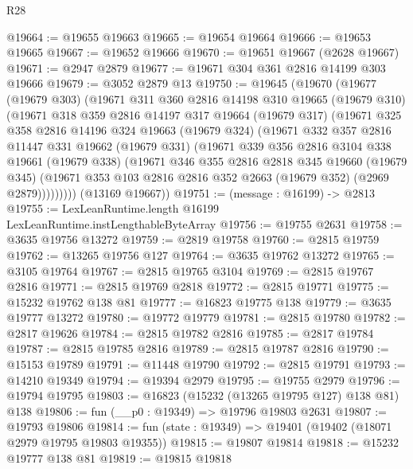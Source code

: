 \begin{lexlean}{R28}
\begin{coremodule}
@19664 := @19655 @19663
@19665 := @19654 @19664
@19666 := @19653 @19665
@19667 := @19652 @19666
@19670 := @19651 @19667 (@2628 @19667)
@19671 := @2947 @2879
@19677 := @19671 @304 @361 @2816 @14199 @303 @19666
@19679 := @3052 @2879 @13
@19750 := @19645
    (@19670
      (@19677
        (@19679 @303)
        (@19671
          @311
          @360
          @2816
          @14198
          @310
          @19665
          (@19679 @310)
          (@19671
            @318
            @359
            @2816
            @14197
            @317
            @19664
            (@19679 @317)
            (@19671
              @325
              @358
              @2816
              @14196
              @324
              @19663
              (@19679 @324)
              (@19671
                @332
                @357
                @2816
                @11447
                @331
                @19662
                (@19679 @331)
                (@19671
                  @339
                  @356
                  @2816
                  @3104
                  @338
                  @19661
                  (@19679 @338)
                  (@19671
                    @346
                    @355
                    @2816
                    @2818
                    @345
                    @19660
                    (@19679 @345)
                    (@19671 @353 @103 @2816 @2816 @352 @2663 (@19679 @352) (@2969 @2879)))))))))
      (@13169 @19667))
@19751 := (message : @16199) -> @2813
@19755 := LexLeanRuntime.length @16199 LexLeanRuntime.instLengthableByteArray
@19756 := @19755 @2631
@19758 := @3635 @19756 @13272
@19759 := @2819 @19758
@19760 := @2815 @19759
@19762 := @13265 @19756 @127
@19764 := @3635 @19762 @13272
@19765 := @3105 @19764
@19767 := @2815 @19765 @3104
@19769 := @2815 @19767 @2816
@19771 := @2815 @19769 @2818
@19772 := @2815 @19771
@19775 := @15232 @19762 @138 @81
@19777 := @16823 @19775 @138
@19779 := @3635 @19777 @13272
@19780 := @19772 @19779
@19781 := @2815 @19780
@19782 := @2817 @19626
@19784 := @2815 @19782 @2816
@19785 := @2817 @19784
@19787 := @2815 @19785 @2816
@19789 := @2815 @19787 @2816
@19790 := @15153 @19789
@19791 := @11448 @19790
@19792 := @2815 @19791
@19793 := @14210 @19349
@19794 := @19394 @2979
@19795 := @19755 @2979
@19796 := @19794 @19795
@19803 := @16823 (@15232 (@13265 @19795 @127) @138 @81) @138
@19806 := fun (__p0 : @19349) => @19796 @19803 @2631
@19807 := @19793 @19806
@19814 := fun (state : @19349) => @19401 (@19402 (@18071 @2979 @19795 @19803 @19355))
@19815 := @19807 @19814
@19818 := @15232 @19777 @138 @81
@19819 := @19815 @19818

\end{coremodule}
\end{lexlean}
